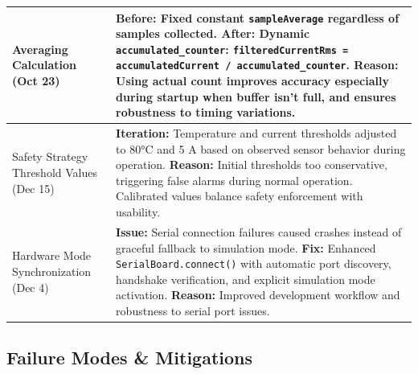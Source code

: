 \documentclass[11pt,a4paper]{article}
\begin{document}
\begin{longtable}{|p{}|p{}|}
\hline
Averaging Calculation (Oct 23) & \textbf{Before:} Fixed constant \texttt{sampleAverage} regardless of samples collected. \newline \textbf{After:} Dynamic \texttt{accumulated\_counter}: \texttt{filteredCurrentRms = accumulatedCurrent / accumulated\_counter}. \newline \textbf{Reason:} Using actual count improves accuracy especially during startup when buffer isn't full, and ensures robustness to timing variations. \\
\hline
Safety Strategy Threshold Values (Dec 15) & \textbf{Iteration:} Temperature and current thresholds adjusted to 80°C and 5 A based on observed sensor behavior during operation. \newline \textbf{Reason:} Initial thresholds too conservative, triggering false alarms during normal operation. Calibrated values balance safety enforcement with usability. \\
\hline
Hardware Mode Synchronization (Dec 4) & \textbf{Issue:} Serial connection failures caused crashes instead of graceful fallback to simulation mode. \newline \textbf{Fix:} Enhanced \texttt{SerialBoard.connect()} with automatic port discovery, handshake verification, and explicit simulation mode activation. \newline \textbf{Reason:} Improved development workflow and robustness to serial port issues. \\
\hline
\end{longtable}

\subsection{Failure Modes \& Mitigations}
\end{document}
